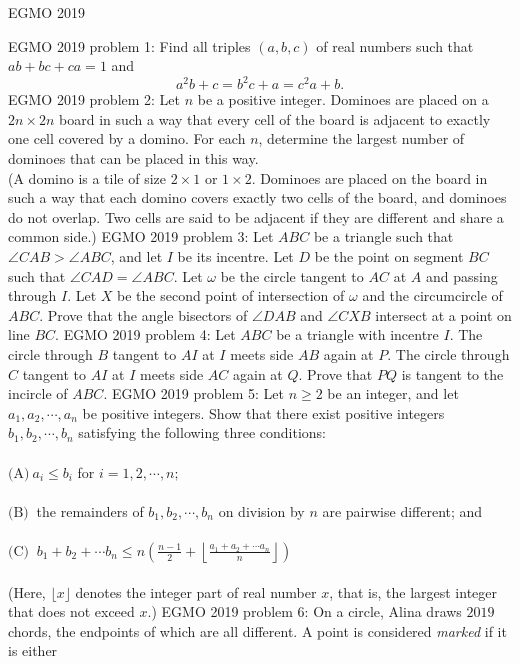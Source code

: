 EGMO 2019 

EGMO 2019 problem 1:  Find all triples $(a, b, c)$ of real numbers such that $ab + bc + ca = 1$ and
\[ a^2b + c = b^2c + a = c^2a + b. \] 
EGMO 2019 problem 2:  Let $n$ be a positive integer. Dominoes are placed on a $2n \times 2n$ board in such a way that every cell of the board is adjacent to exactly one cell covered by a domino. For each $n$, determine the largest number of dominoes that can be placed in this way. \\
(A domino is a tile of size $2 \times 1$ or $1 \times 2$. Dominoes are placed on the board in such a way that each domino covers exactly two cells of the board, and dominoes do not overlap. Two cells are said to be adjacent if they are different and share a common side.) 
EGMO 2019 problem 3:  Let $ABC$ be a triangle such that $\angle CAB > \angle ABC$, and let $I$ be its incentre. Let $D$ be the point on segment $BC$ such that $\angle CAD = \angle ABC$. Let $\omega$ be the circle tangent to $AC$ at $A$ and passing through $I$. Let $X$ be the second point of intersection of $\omega$ and the circumcircle of $ABC$. Prove that the angle bisectors of $\angle DAB$ and $\angle CXB$ intersect at a point on line $BC$. 
EGMO 2019 problem 4:  Let $ABC$ be a triangle with incentre $I$. The circle through $B$ tangent to $AI$ at $I$ meets side $AB$ again at $P$. The circle through $C$ tangent to $AI$ at $I$ meets side $AC$ again at $Q$. Prove that $PQ$ is tangent to the incircle of $ABC.$ 
EGMO 2019 problem 5:  Let $n\ge 2$ be an integer, and let $a_1, a_2, \cdots , a_n$ be positive integers. Show that there exist positive integers $b_1, b_2, \cdots, b_n$ satisfying the following three conditions: \\\\
$\text{(A)} \ a_i\le b_i$ for $i=1, 2, \cdots , n;$ \\\\
$\text{(B)} \ $ the remainders of $b_1, b_2, \cdots, b_n$ on division by $n$ are pairwise different; and \\\\
$\text{(C)} \ $ $b_1+b_2+\cdots b_n \le n\left(\frac{n-1}{2}+\left\lfloor \frac{a_1+a_2+\cdots a_n}{n}\right \rfloor \right)$ \\\\
(Here, $\lfloor x \rfloor$ denotes the integer part of real number $x$, that is, the largest integer that does not exceed $x$.) 
EGMO 2019 problem 6:  On a circle, Alina draws $2019$ chords, the endpoints of which are all different. A point is considered \textit{marked} if it is either \\\\
